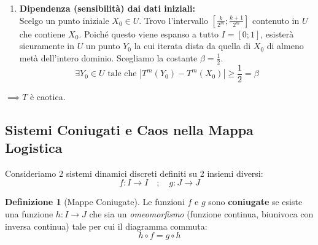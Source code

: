 \documentclass[openany]{book}
\theoremstyle{definition}
\newtheorem*{definizione}{Definizione}
\theoremstyle{remark}
\begin{document}
\begin{enumerate}
\begin{center}
\begin{tikzpicture}[scale=1.5]
    \end{tikzpicture}
    \end{center}

    \item \textbf{Dipendenza (sensibilità) dai dati iniziali:} \\
    Scelgo un punto iniziale $X_0 \in U$. Trovo l'intervallo $\left[ \frac{k}{2^m}; \frac{k+1}{2^m} \right]$ contenuto in $U$ che contiene $X_0$.
    Poiché questo viene espanso a tutto $I = [0; 1]$, esisterà sicuramente in $U$ un punto $Y_0$ la cui iterata dista da quella di $X_0$ di almeno metà dell'intero dominio.
    Scegliamo la costante $\beta = \frac{1}{2}$.
    $$ \exists Y_0 \in U \text{ tale che } |T^m(Y_0) - T^m(X_0)| \geq \frac{1}{2} = \beta $$
\end{enumerate}
$\implies T$ è caotica. 



\subsection{Sistemi Coniugati e Caos nella Mappa Logistica}

Consideriamo 2 sistemi dinamici discreti definiti su 2 insiemi diversi:
$$ f: I \to I \quad ; \quad g: J \to J $$

\begin{definizione}[Mappe Coniugate]
Le funzioni $f$ e $g$ sono \textbf{coniugate} se esiste una funzione $h: I \to J$ che sia un \emph{omeomorfismo} (funzione continua, biunivoca con inversa continua) tale per cui il diagramma commuta:
$$ h \circ f = g \circ h $$
\end{definizione}
\end{document}
